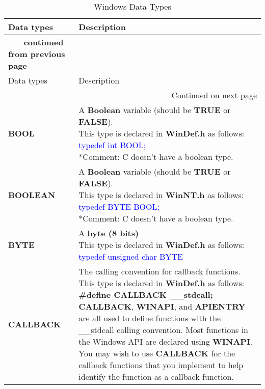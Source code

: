 	\begin{longtable}{|l|l|}
		\caption{Windows Data Types} \label{table: Windows Data Types} \\
		
		\hline Data types & Description \\ \hline 
		\endfirsthead
		
		\hline {{\bfseries \tablename\ \thetable{} -- continued from previous page}} \\
		\hline Data types & Description \\ \hline 
		\endhead
		
		\hline \multicolumn{2}{|r|}{{Continued on next page}} \\ \hline
		\endfoot
		
		\hline \hline
		\endlastfoot
		
		\textbf{BOOL} & \parbox{8cm}{A \textbf{Boolean} variable (should be \textbf{TRUE} or \textbf{FALSE}).\\ This type is declared in \textbf{WinDef.h} as follows:\\ \textcolor{blue}{typedef int BOOL;}\\ *Comment: C doesn't have a boolean type.}\\
		\hline
		\textbf{BOOLEAN} & \parbox{8cm}{A \textbf{Boolean} variable (should be \textbf{TRUE} or \textbf{FALSE}).\\ This type is declared in \textbf{WinNT.h} as follows:\\ \textcolor{blue}{typedef BYTE BOOL;}\\ *Comment: C doesn't have a boolean type.}\\
		\hline
		\textbf{BYTE} & \parbox{8cm}{A \textbf{byte (8 bits)}\\ This type is declared in \textbf{WinDef.h} as follows:\\ \textcolor{blue}{typedef unsigned char BYTE}}\\
		\hline
		\textbf{CALLBACK} & \parbox{8cm}{The calling convention for callback functions.\\ This type is declared in \textbf{WinDef.h} as follows:\\ \textbf{\#define CALLBACK \_\_stdcall;}\\ \textbf{CALLBACK}, \textbf{WINAPI}, and \textbf{APIENTRY} are all used to define functions with the \_\_stdcall calling convention. Most functions in the Windows API are declared using \textbf{WINAPI}. You may wish to use \textbf{CALLBACK} for the callback functions that you implement to help identify the function as a callback function.}\\

\end{longtable}
